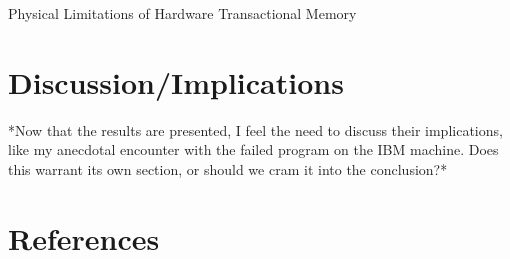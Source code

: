 \documentclass{article}
\begin{document}
\newcommand{\figuretitle}[1]{\textbf{#1}\\\vspace{2mm}}

\begin{center}
{\huge Physical Limitations of Hardware Transactional Memory}
\end{center}






\section{Discussion/Implications}
*Now that the results are presented, I feel the need to discuss their
implications, like my anecdotal encounter with the failed program on the IBM
machine. Does this warrant its own section, or should we cram it into the
conclusion?*



\section{References}
\end{document}
